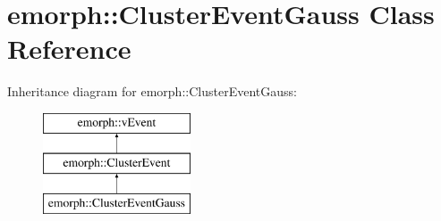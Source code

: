 \hypertarget{classemorph_1_1ClusterEventGauss}{\section{emorph\-:\-:Cluster\-Event\-Gauss Class Reference}
\label{classemorph_1_1ClusterEventGauss}
}
Inheritance diagram for emorph\-:\-:Cluster\-Event\-Gauss\-:\begin{figure}[H]
\begin{center}
\leavevmode
\includegraphics[height=3.000000cm]{classemorph_1_1ClusterEventGauss}
\end{center}
\end{figure}
